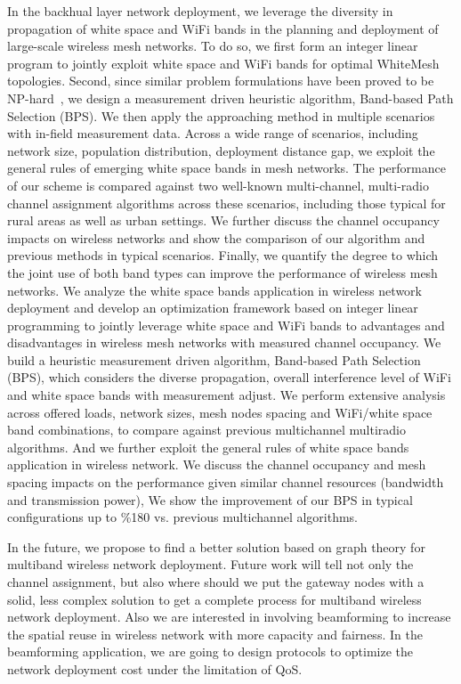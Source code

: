 In the backhual layer network deployment, we leverage the diversity 
in propagation of white space and WiFi bands in the planning and deployment
of large-scale wireless mesh networks. To do so, we first form an 
integer linear program to jointly exploit white space and WiFi bands 
for optimal WhiteMesh topologies. Second, since similar problem 
formulations have been proved to be NP-hard~\cite{jain2005impact}, 
we design a measurement driven heuristic algorithm, Band-based Path 
Selection (BPS). We then apply the approaching method in multiple 
scenarios with in-field measurement data. Across a wide range of 
scenarios, including network size, population distribution, deployment 
distance gap, we exploit the general rules of emerging white space 
bands in mesh networks. The performance of our scheme is compared 
against two well-known multi-channel, multi-radio channel assignment 
algorithms across these scenarios, including those typical for rural 
areas as well as urban settings. We further discuss the channel occupancy 
impacts on wireless networks and show the comparison of our algorithm 
and previous methods in typical scenarios. Finally, we quantify the degree 
to which the joint use of both band types can improve the performance of 
wireless mesh networks. We analyze the white space bands application in 
wireless network deployment and develop an optimization framework based 
on integer linear programming to jointly leverage white space and WiFi 
bands to advantages and disadvantages in wireless mesh networks with measured
channel occupancy. We build a heuristic measurement driven algorithm, 
Band-based Path Selection (BPS), which considers the diverse propagation, 
overall interference level of WiFi and white space bands with measurement 
adjust. We perform extensive analysis across offered loads, network sizes, 
mesh nodes spacing and WiFi/white space band combinations, to compare 
against previous multichannel multiradio algorithms. And we further 
exploit the general rules of white space bands application in wireless 
network. We discuss the channel occupancy and mesh spacing impacts on the 
performance given similar channel resources (bandwidth and transmission 
power), We show the improvement of our BPS in typical configurations up to 
\%180 vs. previous multichannel algorithms.



In the future, we propose to find a better solution based on graph
theory for multiband wireless network deployment. Future work will
tell not only the channel assignment, but also where should we put
the gateway nodes with a solid, less complex solution to get a 
complete process for multiband wireless network deployment. Also 
we are interested in involving beamforming to increase the spatial
reuse in wireless network with more capacity and fairness. 
In the beamforming application, we are going to design protocols to 
optimize the network deployment cost under the limitation of QoS.

